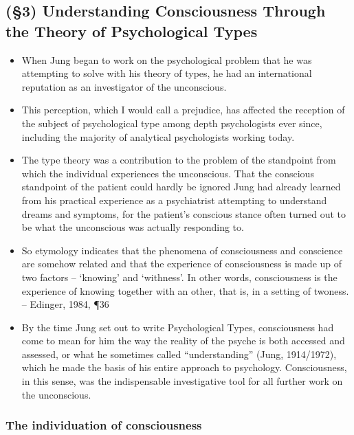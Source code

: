 \subsection{(\S3) Understanding Consciousness Through the Theory of Psychological Types}

\begin{itemize}

\item When Jung began to work on the psychological problem that he was
attempting to solve with his theory of types, he had an international
reputation as an investigator of the unconscious.

\item This perception, which I would call a prejudice, has affected the
reception of the subject of psychological type among depth psychologists ever
since, including the majority of analytical psychologists working today.

\item The type theory was a contribution to the problem of the standpoint from
which the individual experiences the unconscious. That the conscious standpoint
of the patient could hardly be ignored Jung had already learned from his
practical experience as a psychiatrist attempting to understand dreams and
symptoms, for the patient's conscious stance often turned out to be what the
unconscious was actually responding to.

\item So etymology indicates that the phenomena of consciousness and conscience
are somehow related and that the experience of consciousness is made up of two
factors -- `knowing' and `withness'. In other words, consciousness is the
experience of knowing together with an other, that is, in a setting of twoness.
-- Edinger, 1984, \P 36

\item By the time Jung set out to write Psychological Types, consciousness had
come to mean for him the way the reality of the psyche is both accessed and
assessed, or what he sometimes called ``understanding'' (Jung, 1914/1972),
which he made the basis of his entire approach to psychology. Consciousness, in
this sense, was the indispensable investigative tool for all further work on
the unconscious.

\end{itemize}

\subsubsection{The individuation of consciousness}

